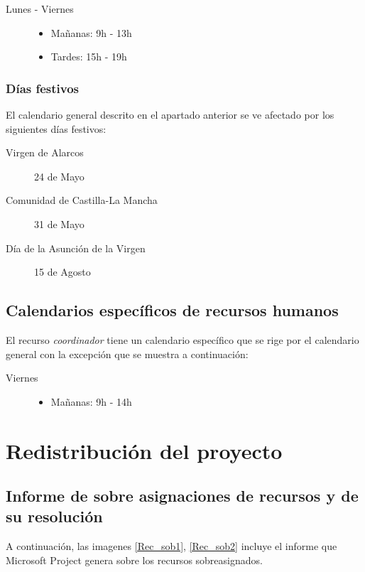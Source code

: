 \documentclass[11pt,a4paper,spanish,twoside]{book}
\begin{document}
\begin{description}
\item[Lunes - Viernes] \hfill
  \begin{itemize}
  \item Mañanas: 9h - 13h
  \item Tardes: 15h - 19h
  \end{itemize}
\end{description}

\subsection{Días festivos}
El calendario general descrito en el apartado anterior se ve afectado por los
siguientes días festivos:

\begin{description}
\item[Virgen de Alarcos] 24 de Mayo
\item[Comunidad de Castilla-La Mancha] 31 de Mayo
\item[Día de la Asunción de la Virgen] 15 de Agosto
\end{description}

\section{Calendarios específicos de recursos humanos}
El recurso \emph{coordinador} tiene un calendario específico que se rige por
el calendario general con la excepción que se muestra a continuación:

\begin{description}
\item[Viernes] \hfill
  \begin{itemize}
  \item Mañanas: 9h - 14h
  \end{itemize}
\end{description}


\chapter{Redistribución del proyecto}
\newpage
\section[Informe de sobre asignaciones]
{Informe de sobre asignaciones de recursos y de su resolución}
A continuación, las imagenes \ref{Rec_sob1}, \ref{Rec_sob2} incluye el
informe que Microsoft Project genera sobre los recursos sobreasignados.
\end{document}
